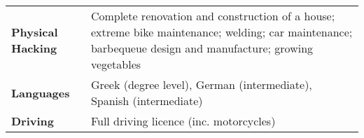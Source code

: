 \documentclass[a4paper,10pt]{article}
\begin{document}

\begin{tabular}{p{1.8in}p{4.3in}}
\textbf{Physical Hacking} & Complete renovation and construction of a house; extreme bike maintenance; welding; car maintenance; barbequeue design and manufacture; growing vegetables\\
\textbf{Languages} & Greek (degree level), German (intermediate), Spanish (intermediate)\\
\textbf{Driving} & Full driving licence (inc. motorcycles) \\

\end{tabular}
\end{document}
